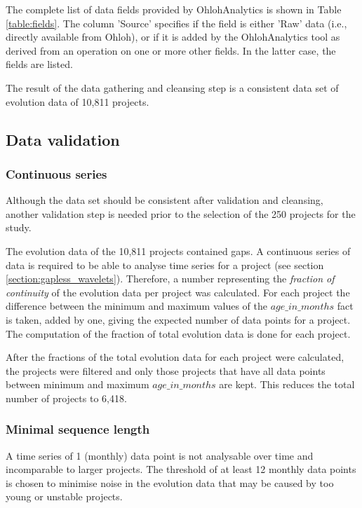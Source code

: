 The complete list of data fields provided by OhlohAnalytics is shown in Table
\ref{table:fields}. The column 'Source' specifies if the field is either 'Raw'
data (i.e., directly available from Ohloh), or if it is added by the
OhlohAnalytics tool as derived from an operation on one or more other fields.
In the latter case, the fields are listed.

The result of the data gathering and cleansing step is a consistent data set of
evolution data of 10,811 projects.



\subsection{Data validation}
\subsubsection{Continuous series}
Although the data set should be consistent after validation and cleansing,
another validation step is needed prior to the selection of the 250 projects
for the study.

The evolution data of the 10,811 projects contained gaps. A continuous series
of data is required to be able to analyse time series for a project (see
section \ref{section:gapless_wavelets}). Therefore, a number representing the
\textit{fraction of continuity} of the evolution data per project was
calculated. For each project the difference between the minimum and maximum
values of the $age\_in\_months$ fact is taken, added by one, giving the
expected number of data points for a project. The computation of the fraction
of total evolution data is done for each project.

After the fractions of the total evolution data for each project were
calculated, the projects were filtered and only those projects that have all
data points between minimum and maximum $age\_in\_months$ are kept. This
reduces the total number of projects to 6,418.

\subsubsection{Minimal sequence length}
A time series of 1 (monthly) data point is not analysable over time and
incomparable to larger projects. The threshold of at least 12 monthly data
points is chosen to minimise noise in the evolution data that may be caused by
too young or unstable projects.

